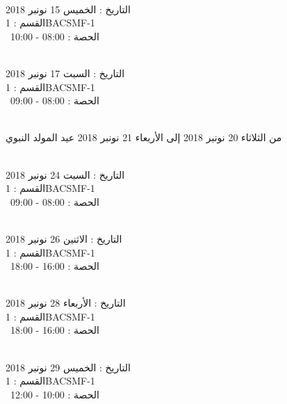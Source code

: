 \par
\noindent\makebox[\linewidth]{\rule{\paperwidth}{0.4pt}}
 \\
التاريخ : الخميس 15 نونبر 2018 \\
القسم : 1BACSMF-1 \\
 \  
الحصة : 08:00 - 10:00 \\
\par
\noindent\makebox[\linewidth]{\rule{\paperwidth}{0.4pt}}
 \\
التاريخ : السبت 17 نونبر 2018 \\
القسم : 1BACSMF-1 \\
 \  
الحصة : 08:00 - 09:00 \\
\par
\noindent\makebox[\linewidth]{\rule{\paperwidth}{0.4pt}}
 \\
من الثلاثاء 20 نونبر 2018 إلى الأربعاء 21 نونبر 2018
\newline
\indent
  عيد المولد النبوي
\par
\noindent\makebox[\linewidth]{\rule{\paperwidth}{0.4pt}}
 \\
التاريخ : السبت 24 نونبر 2018 \\
القسم : 1BACSMF-1 \\
 \  
الحصة : 08:00 - 09:00 \\
\par
\noindent\makebox[\linewidth]{\rule{\paperwidth}{0.4pt}}
 \\
التاريخ : الاثنين 26 نونبر 2018 \\
القسم : 1BACSMF-1 \\
 \  
الحصة : 16:00 - 18:00 \\
\par
\noindent\makebox[\linewidth]{\rule{\paperwidth}{0.4pt}}
 \\
التاريخ : الأربعاء 28 نونبر 2018 \\
القسم : 1BACSMF-1 \\
 \  
الحصة : 16:00 - 18:00 \\
\par
\noindent\makebox[\linewidth]{\rule{\paperwidth}{0.4pt}}
 \\
التاريخ : الخميس 29 نونبر 2018 \\
القسم : 1BACSMF-1 \\
 \  
الحصة : 10:00 - 12:00 \\
